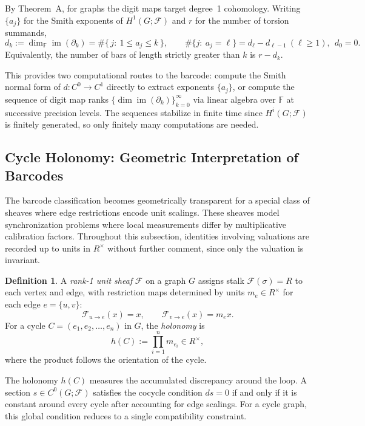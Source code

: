 \documentclass[11pt]{amsart}
\theoremstyle{plain}
\theoremstyle{definition}
\newtheorem{definition}[theorem]{Definition}
\newcommand{\Ring}{R}                          %
\newcommand{\sheaf}[1]{\mathcal{#1}}                  %
\newcommand{\stalk}[2]{#1(#2)}                        %
\newcommand{\face}{\to}                               %
\newcommand{\res}[3]{#1_{#2 \face #3}}                  %
\newcommand{\Digit}[1]{\partial_{#1}}%
\newcommand{\coboundary}{d}                           %
\DeclareMathOperator{\im}{im}                         %
\begin{document}
By Theorem~A, for graphs the digit maps target degree~1 cohomology. Writing $\{a_j\}$ for the Smith exponents of $H^1(G;\sheaf{F})$ and $r$ for the number of torsion summands,
\[
d_k:=\dim_{\mathbb{F}}\im(\Digit{k})=\#\{\,j:\ 1\le a_j\le k\,\},
\qquad
\#\{j:\ a_j=\ell\}=d_\ell-d_{\ell-1}\ (\ell\ge1),\ \ d_0=0.
\]
Equivalently, the number of bars of length strictly greater than $k$ is $r-d_k$.

This provides two computational routes to the barcode: compute the Smith normal form of $\coboundary: C^0 \to C^1$ directly to extract exponents $\{a_j\}$, or compute the sequence of digit map ranks $\{\dim \im(\Digit{k})\}_{k=0}^{\infty}$ via linear algebra over $\mathbb{F}$ at successive precision levels. The sequences stabilize in finite time since $H^i(G;\sheaf{F})$ is finitely generated, so only finitely many computations are needed.

\subsection{Cycle Holonomy: Geometric Interpretation of Barcodes}
\label{ssec:cycle-holonomy}

The barcode classification becomes geometrically transparent for a special class of sheaves where edge restrictions encode unit scalings. These sheaves model synchronization problems where local measurements differ by multiplicative calibration factors. Throughout this subsection, identities involving valuations are recorded up to units in $\Ring^\times$ without further comment, since only the valuation is invariant.

\begin{definition}
\label{def:unit-sheaf}
A \emph{rank-1 unit sheaf} $\sheaf{F}$ on a graph $G$ assigns stalk $\stalk{\sheaf{F}}{\sigma} = \Ring$ to each vertex and edge, with restriction maps determined by units $m_e \in \Ring^\times$ for each edge $e = \{u,v\}$:
\[
\res{\sheaf{F}}{u}{e}(x) = x, \qquad \res{\sheaf{F}}{v}{e}(x) = m_e x.
\]
For a cycle $C = (e_1, e_2, \ldots, e_n)$ in $G$, the \emph{holonomy} is
\[
h(C) := \prod_{i=1}^n m_{e_i} \in \Ring^\times,
\]
where the product follows the orientation of the cycle.
\end{definition}

The holonomy $h(C)$ measures the accumulated discrepancy around the loop. A section $s \in C^0(G;\sheaf{F})$ satisfies the cocycle condition $\coboundary s = 0$ if and only if it is constant around every cycle after accounting for edge scalings. For a cycle graph, this global condition reduces to a single compatibility constraint.
\end{document}
